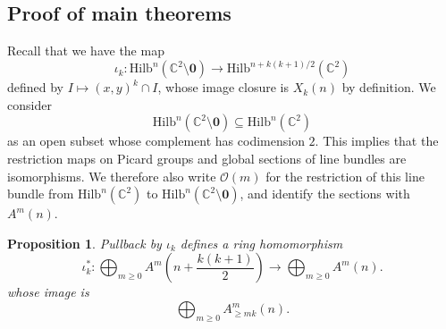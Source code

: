 \documentclass[12pt]{amsart}
\newcommand{\Hilb}{\mathrm{Hilb}}
\newcommand{\C}{\mathbb{C}}
\newcommand{\CO}{\mathcal{O}}
\numberwithin{equation}{section}
\newtheorem{proposition}[theorem]{Proposition}
\theoremstyle{definition}
\begin{document}
\subsection{Proof of main theorems}

Recall that we have the map
\[ \iota_k: \Hilb^n(\C^2\setminus\mathbf{0})\to \Hilb^{n+k(k+1)/2}(\C^2) \]
defined by $I\mapsto (x,y)^k \cap I$, whose image closure is $X_k(n)$ by definition. We consider 
\[ \Hilb^n(\C^2\setminus\mathbf{0}) \subseteq \Hilb^n(\C^2) \]
as an open subset whose complement has codimension $2$. This implies that the restriction maps on Picard groups and global sections of line bundles are isomorphisms. We therefore also write $\CO(m)$ for the restriction of this line bundle from $\Hilb^n(\C^2)$ to $\Hilb^n(\C^2\setminus\mathbf{0})$, and identify the sections with $A^m(n)$.

\begin{proposition}\label{prop:image of pullback}
    Pullback by $\iota_k$ defines a ring homomorphism
    \begin{equation}\label{eq:ringmap}
         \iota_k^*: \bigoplus_{m\geq 0} A^m\left(n+\frac{k(k+1)}{2}\right) \to \bigoplus_{m\geq 0} A^m(n).
    \end{equation}
    whose image is
    \[ \bigoplus_{m\geq 0} A^m_{\geq mk}(n). \]
\end{proposition}
\end{document}
